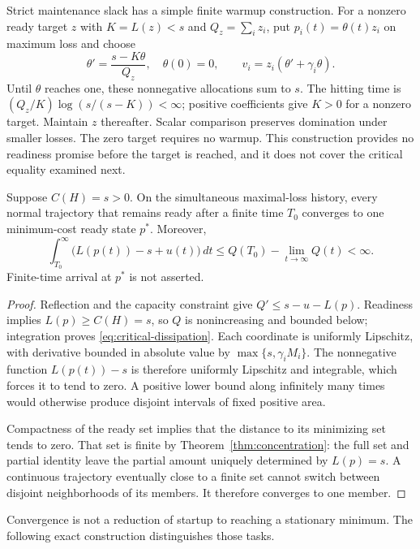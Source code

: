 Strict maintenance slack has a simple finite warmup construction. For a
nonzero ready target $z$ with $K=L(z)<s$ and $Q_z=\sum_i z_i$, put
$p_i(t)=\theta(t)z_i$ on maximum loss and choose
\[
 \theta'=\frac{s-K\theta}{Q_z},\quad \theta(0)=0,
 \qquad v_i=z_i(\theta'+\gamma_i\theta).
\]
Until $\theta$ reaches one, these nonnegative allocations sum to $s$.
The hitting time is $(Q_z/K)\log(s/(s-K))<\infty$; positive coefficients
give $K>0$ for a nonzero target. Maintain $z$ thereafter. Scalar comparison
preserves domination under smaller losses. The zero target requires no
warmup. This construction provides no readiness promise before the target
is reached, and it does not cover the critical equality examined next.

\begin{proposition}
\label{prop:critical-convergence}
Suppose $C(H)=s>0$. On the simultaneous maximal-loss history, every normal
trajectory that remains ready after a finite time $T_0$ converges to one
minimum-cost ready state $p^*$. Moreover,
\begin{equation}
 \int_{T_0}^{\infty}\bigl(L(p(t))-s+u(t)\bigr)\,dt
 \leq Q(T_0)-\lim_{t\to\infty}Q(t)<\infty.
 \label{eq:critical-dissipation}
\end{equation}
Finite-time arrival at $p^*$ is not asserted.
\end{proposition}

\begin{proof}
Reflection and the capacity constraint give
$Q'\leq s-u-L(p)$. Readiness implies $L(p)\geq C(H)=s$, so $Q$ is
nonincreasing and bounded below; integration proves
\eqref{eq:critical-dissipation}. Each coordinate is uniformly Lipschitz,
with derivative bounded in absolute value by
$\max\{s,\gamma_iM_i\}$. The nonnegative function $L(p(t))-s$ is therefore
uniformly Lipschitz and integrable, which forces it to tend to zero. A
positive lower bound along infinitely many times would otherwise produce
disjoint intervals of fixed positive area.

Compactness of the ready set implies that the distance to its minimizing
set tends to zero. That set is finite by Theorem~\ref{thm:concentration}:
the full set and partial identity leave the partial amount uniquely
determined by $L(p)=s$. A continuous trajectory eventually close to a
finite set cannot switch between disjoint neighborhoods of its members.
It therefore converges to one member.
\end{proof}

Convergence is not a reduction of startup to reaching a stationary
minimum. The following exact construction distinguishes those tasks.

